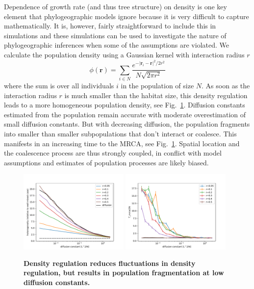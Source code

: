 \documentclass[aps,rmp, onecolumn]{revtex4}
\newcommand{\rvec}{\mathbf{r}}
\begin{document}
Dependence of growth rate (and thus tree structure) on density is one key element that phylogeographic models ignore because it is very difficult to capture mathematically.
It is, however, fairly straightforward to include this in simulations and these simulations can be used to investigate the nature of phylogeographic inferences when some of the assumptions are violated.
We calculate the population density using a Gaussian kernel with interaction radius $r$
\begin{equation}
    \phi(\rvec) = \sum_{i\in N} \frac{e^{-|\rvec_i - \rvec|^2/2r^2}}{N\sqrt{2\pi r^2}}
\end{equation}
where the sum is over all individuals $i$ in the population of size $N$.
As soon as the interaction radius $r$ is much smaller than the habitat size, this density regulation leads to a more homogeneous population density, see Fig.~\ref{fig:density_reg}.
Diffusion constants estimated from the population remain accurate with moderate overestimation of small diffusion constants.
But with decreasing diffusion, the population fragments into smaller than smaller subpopulations that don't interact or coalesce.
This manifests in an increasing time to the MRCA, see Fig.~\ref{fig:density_reg}.
Spatial location and the coalescence process are thus strongly coupled, in conflict with model assumptions and estimates of population processes are likely biased.

\begin{figure}
    \includegraphics[width=0.48\textwidth]{figures/density_reg_heterogeneity.pdf}
    \includegraphics[width=0.48\textwidth]{figures/density_reg_tmrca.pdf}
    \caption{\label{fig:density_reg} {\bf Density regulation reduces fluctuations in density regulation, but results in population fragmentation at low diffusion constants.}}
\end{figure}
\end{document}
